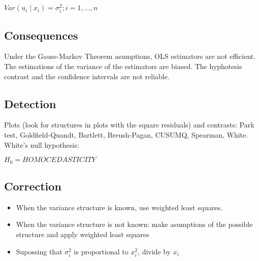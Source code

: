 \documentclass[10pt,landscape]{article}
\begin{document}
\begin{multicols}{3}
$Var(u_i \mid x_i) = \sigma_i^2; i = 1, ..., n$

\subsection*{Consequences}
Under the Gauss-Markov Theorem asumptions, OLS estimators are not efficient. The estimations of the variance of the estimators are biased. The hyphotesis contrast and the confidence intervals are not reliable.
\subsection*{Detection}
Plots (look for structures in plots with the square residuals) and contrasts: Park test, Goldfield-Quandt, Bartlett, Breush-Pagan, CUSUMQ, Spearman, White.
White's null hypothesis:

$H_0 = HOMOCEDASTICITY$
\subsection*{Correction}
\begin{itemize}
	\item When the variance structure is known, use weighted least squares.
	\item When the variance structure is not known: make asumptions of the possible structure and apply weighted least squares
	\item Supossing that $\sigma_i^2$ is proportional to $x_i^2$, divide by $x_i$
\end{itemize}
\lipsum

\end{multicols}
\end{document}
